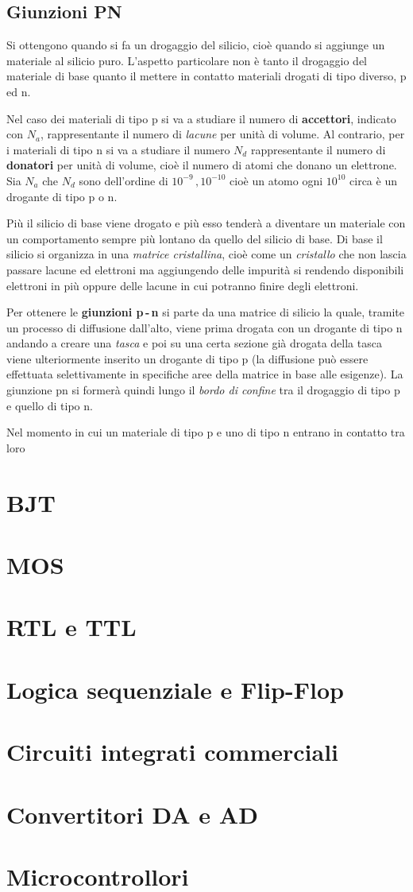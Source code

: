 \documentclass[12pt, a4paper]{report}
\begin{document}
\section{Giunzioni PN}
Si ottengono quando si fa un drogaggio del silicio, cioè quando si aggiunge un materiale al silicio puro. L'aspetto particolare non è tanto il drogaggio del materiale di base quanto il mettere in contatto materiali drogati di tipo diverso, p ed n.

Nel caso dei materiali di tipo p si va a studiare il numero di \textbf{accettori}, indicato con $N_{a}$, rappresentante il numero di \textit{lacune} per unità di volume. Al contrario, per i materiali di tipo n si va a studiare il numero $N_{d}$ rappresentante il numero di \textbf{donatori} per unità di volume, cioè il numero di atomi che donano un elettrone. Sia $N_{a}$ che $N_{d}$ sono dell'ordine di $10^{-9}\,, 10^{-10}$ cioè un atomo ogni $10^{10}$ circa è un drogante di tipo p o n.

Più il silicio di base viene drogato e più esso tenderà a diventare un materiale con un comportamento sempre più lontano da quello del silicio di base. Di base il silicio si organizza in una \textit{matrice cristallina}, cioè come un \textit{cristallo} che non lascia passare lacune ed elettroni ma aggiungendo delle impurità si rendendo disponibili elettroni in più oppure delle lacune in cui potranno finire degli elettroni.

Per ottenere le \textbf{giunzioni p\,-\,n} si parte da una matrice di silicio la quale, tramite un processo di diffusione dall'alto, viene prima drogata con un drogante di tipo n andando a creare una \textit{tasca} e poi su una certa sezione già drogata della tasca viene ulteriormente inserito un drogante di tipo p (la diffusione può essere effettuata selettivamente in specifiche aree della matrice in base alle esigenze). La giunzione pn si formerà quindi lungo il \textit{bordo di confine} tra il drogaggio di tipo p e quello di tipo n.

Nel momento in cui un materiale di tipo p e uno di tipo n entrano in contatto tra loro

\chapter{BJT}
\chapter{MOS}
\chapter{RTL e TTL}
\chapter{Logica sequenziale e Flip-Flop}
\chapter{Circuiti integrati commerciali}
\chapter{Convertitori DA e AD}
\chapter{Microcontrollori}
\end{document}
